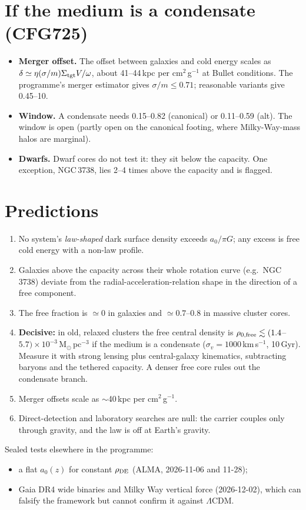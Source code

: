 \documentclass[10pt]{article}
\begin{document}
\section{If the medium is a condensate (CFG725)}
\begin{itemize}
\item \textbf{Merger offset.} The offset between galaxies and cold energy scales as $\delta\simeq\eta(\sigma/m)\Sigma_{\rm tgt}V/\omega$, about 41--44\,kpc per cm$^2$\,g$^{-1}$ at Bullet conditions. The programme's merger estimator gives $\sigma/m\le0.71$; reasonable variants give 0.45--10.
\item \textbf{Window.} A condensate needs 0.15--0.82 (canonical) or 0.11--0.59 (alt). The window is open (partly open on the canonical footing, where Milky-Way-mass halos are marginal).
\item \textbf{Dwarfs.} Dwarf cores do not test it: they sit below the capacity. One exception, NGC\,3738, lies 2--4 times above the capacity and is flagged.
\end{itemize}

\section{Predictions}
\begin{enumerate}
\item No system's \emph{law-shaped} dark surface density exceeds $a_0/\pi G$; any excess is free cold energy with a non-law profile.
\item Galaxies above the capacity across their whole rotation curve (e.g.\ NGC\,3738) deviate from the radial-acceleration-relation shape in the direction of a free component.
\item The free fraction is $\simeq0$ in galaxies and $\simeq0.7$--0.8 in massive cluster cores.
\item \textbf{Decisive:} in old, relaxed clusters the free central density is $\rho_{0,{\rm free}}\lesssim(1.4$--$5.7)\times10^{-3}$\,M$_\odot$\,pc$^{-3}$ if the medium is a condensate ($\sigma_v=1000$\,km\,s$^{-1}$, 10\,Gyr). Measure it with strong lensing plus central-galaxy kinematics, subtracting baryons and the tethered capacity. A denser free core rules out the condensate branch.
\item Merger offsets scale as $\sim$40\,kpc per cm$^2$\,g$^{-1}$.
\item Direct-detection and laboratory searches are null: the carrier couples only through gravity, and the law is off at Earth's gravity.
\end{enumerate}
Sealed tests elsewhere in the programme:
\begin{itemize}
\item a flat $a_0(z)$ for constant $\rho_{\rm DE}$ (ALMA, 2026-11-06 and 11-28);
\item Gaia DR4 wide binaries and Milky Way vertical force (2026-12-02), which can falsify the framework but cannot confirm it against $\Lambda$CDM.
\end{itemize}
\end{document}
